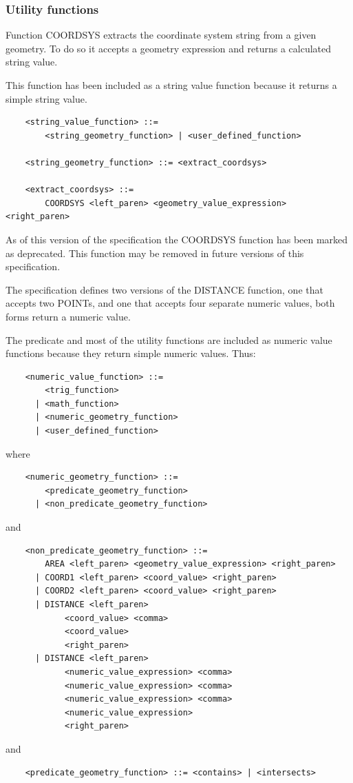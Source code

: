 \documentclass[11pt,a4paper]{ivoa}
\begin{document}

\subsubsection{Utility functions}
\label{sec:functions.geom.utility}

Function COORDSYS extracts the coordinate system string from a given
geometry. To do so it accepts a geometry expression and returns a calculated
string value.

This function has been included as a string value function because it
returns a simple string value.

\begin{verbatim}
    <string_value_function> ::=
        <string_geometry_function> | <user_defined_function>

    <string_geometry_function> ::= <extract_coordsys>

    <extract_coordsys> ::=
        COORDSYS <left_paren> <geometry_value_expression> <right_paren>
\end{verbatim}

As of this version of the specification the COORDSYS function has
been marked as deprecated. This function may be removed in future versions
of this specification.

The specification defines two versions of the DISTANCE function,
one that accepts two POINTs, and one that accepts four
separate numeric values, both forms return a numeric value.

The predicate and most of the utility functions are included as numeric
value functions because they return simple numeric values.
Thus:
\begin{verbatim}
    <numeric_value_function> ::=
        <trig_function>
      | <math_function>
      | <numeric_geometry_function>
      | <user_defined_function>
\end{verbatim}
\noindent
where
\begin{verbatim}
    <numeric_geometry_function> ::=
        <predicate_geometry_function>
      | <non_predicate_geometry_function>
\end{verbatim}
\noindent
and
\begin{verbatim}
    <non_predicate_geometry_function> ::=
        AREA <left_paren> <geometry_value_expression> <right_paren>
      | COORD1 <left_paren> <coord_value> <right_paren>
      | COORD2 <left_paren> <coord_value> <right_paren>
      | DISTANCE <left_paren>
            <coord_value> <comma>
            <coord_value>
            <right_paren>
      | DISTANCE <left_paren>
            <numeric_value_expression> <comma>
            <numeric_value_expression> <comma>
            <numeric_value_expression> <comma>
            <numeric_value_expression>
            <right_paren>
\end{verbatim}
\noindent
and
\begin{verbatim}
    <predicate_geometry_function> ::= <contains> | <intersects>
\end{verbatim}
\end{document}
